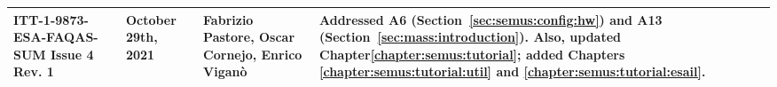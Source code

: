 \begin{longtable}{|p{2cm}|p{2cm}|p{2cm}|p{8cm}|@{}}
\hline

ITT-1-9873-ESA-FAQAS-SUM
Issue 4 Rev. 1&
October 29th, 2021&
Fabrizio Pastore, Oscar Cornejo, Enrico Viganò&
\begin{minipage}{8cm}
Addressed A6 (Section~\ref{sec:semus:config:hw}) and A13 (Section~\ref{sec:mass:introduction}). Also, updated Chapter\ref{chapter:semus:tutorial}; added Chapters \ref{chapter:semus:tutorial:util} and \ref{chapter:semus:tutorial:esail}.
\end{minipage}
\\

\hline



                                                    
\end{longtable}
\normalsize

\clearpage